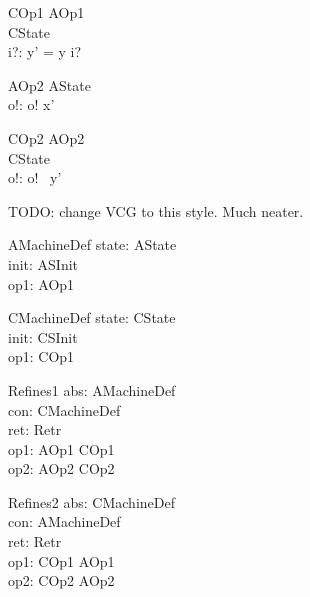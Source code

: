 \begin{schema}{COp1}
\zfsrefines AOp1\\
   \Delta CState \\
   i?: \nat
\where
   y' = y \cat \langle i? \rangle
\end{schema}

\begin{schema}{AOp2}
   \Xi AState \\
   o!: \nat
\where
    o! \in  x'
\end{schema}

\begin{schema}{COp2}
\zfsrefines AOp2\\
   \Xi CState \\
   o!: \nat
\where
   o! \in \ran~y'
\end{schema}

TODO: change VCG to this style. Much neater.

\begin{schema}{AMachineDef}
   state: AState \\
   init: ASInit \\
   op1: AOp1
\end{schema}

\begin{schema}{CMachineDef}
   state: CState \\
   init: CSInit \\
   op1: COp1
\end{schema}

\begin{schema}{Refines1}
   abs: AMachineDef \\
   con: CMachineDef \\
   ret: Retr \\
   op1: AOp1 \cross COp1 \\
   op2: AOp2 \cross COp2
\end{schema}

\begin{schema}{Refines2}
   abs: CMachineDef \\
   con: AMachineDef \\
   ret: Retr \\
   op1: COp1 \cross AOp1 \\
   op2: COp2 \cross AOp2
\end{schema}
